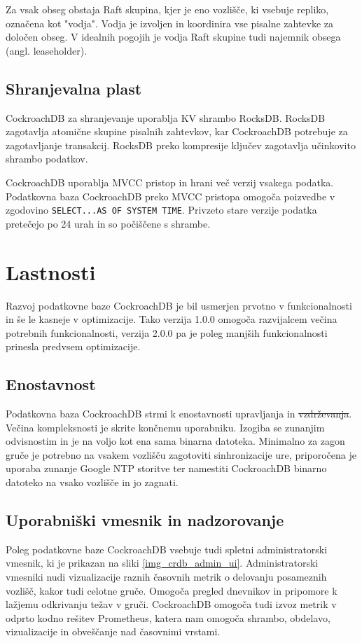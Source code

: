 \documentclass[a4paper, 12pt]{book}
\providecommand{\DIFaddtex}[1]{{\protect\color{blue}\uwave{#1}}} %
\providecommand{\DIFdeltex}[1]{{\protect\color{red}\sout{#1}}}                      %
\providecommand{\DIFaddbegin}{} %
\providecommand{\DIFaddend}{} %
\providecommand{\DIFdelbegin}{} %
\providecommand{\DIFdelend}{} %
\providecommand{\DIFadd}[1]{\texorpdfstring{\DIFaddtex{#1}}{#1}} %
\providecommand{\DIFdel}[1]{\texorpdfstring{\DIFdeltex{#1}}{}} %
\newcommand{\DIFscaledelfig}{0.5}
\newlength{\DIFdelgraphicswidth} %
\newlength{\DIFdelgraphicsheight} %
\newcommand{\DIFaddincludegraphics}[2][]{{\color{blue}\fbox{\DIFOincludegraphics[#1]{#2}}}} %
\newcommand{\DIFdelincludegraphics}[2][]{%
\sbox{\DIFdelgraphicsbox}{\DIFOincludegraphics[#1]{#2}}%
\settoboxwidth{\DIFdelgraphicswidth}{\DIFdelgraphicsbox} %
\settoboxtotalheight{\DIFdelgraphicsheight}{\DIFdelgraphicsbox} %
\scalebox{\DIFscaledelfig}{%
\parbox[b]{\DIFdelgraphicswidth}{\usebox{\DIFdelgraphicsbox}\\[-\baselineskip] \rule{\DIFdelgraphicswidth}{0em}}\llap{\resizebox{\DIFdelgraphicswidth}{\DIFdelgraphicsheight}{%
\setlength{\unitlength}{\DIFdelgraphicswidth}%
\begin{picture}(1,1)%
\thicklines\linethickness{2pt} %
{\color[rgb]{1,0,0}\put(0,0){\framebox(1,1){}}}%
{\color[rgb]{1,0,0}\put(0,0){\line( 1,1){1}}}%
{\color[rgb]{1,0,0}\put(0,1){\line(1,-1){1}}}%
\end{picture}%
}\hspace*{3pt}}} %
} %
\DeclareRobustCommand{\DIFaddbegin}{\DIFOaddbegin \let\includegraphics\DIFaddincludegraphics} %
\DeclareRobustCommand{\DIFaddend}{\DIFOaddend \let\includegraphics\DIFOincludegraphics} %
\DeclareRobustCommand{\DIFdelbegin}{\DIFOdelbegin \let\includegraphics\DIFdelincludegraphics} %
\DeclareRobustCommand{\DIFdelend}{\DIFOaddend \let\includegraphics\DIFOincludegraphics} %
\begin{document}
Za vsak obseg obstaja Raft skupina, kjer je eno vozlišče, ki vsebuje repliko, označena kot "vodja". Vodja je izvoljen in koordinira vse pisalne zahtevke za določen obseg. V idealnih pogojih je vodja Raft skupine tudi najemnik obsega (angl. leaseholder).


\subsection{Shranjevalna plast}

CockroachDB za shranjevanje uporablja KV shrambo RocksDB. RocksDB zagotavlja atomične skupine pisalnih zahtevkov, kar CockroachDB potrebuje za zagotavljanje transakcij. RocksDB preko kompresije ključev zagotavlja učinkovito shrambo podatkov.

CockroachDB uporablja MVCC pristop in hrani več verzij vsakega podatka. Podatkovna baza CockroachDB preko MVCC pristopa omogoča poizvedbe v zgodovino \texttt{SELECT...AS OF SYSTEM TIME}. Privzeto stare verzije podatka pretečejo po 24 urah in so počiščene s shrambe.

\section{Lastnosti}
Razvoj podatkovne baze CockroachDB je bil usmerjen prvotno v funkcionalnosti in še le kasneje v optimizacije. Tako verzija 1.0.0 omogoča razvijalcem večina potrebnih funkcionalnosti, verzija 2.0.0 pa je poleg manjših funkcionalnosti prinesla predvsem optimizacije.

\subsection{Enostavnost}
Podatkovna baza CockroachDB strmi k enostavnosti upravljanja in \DIFdelbegin \DIFdel{vzdrževanja}\DIFdelend \DIFaddbegin \DIFadd{vzdr\-že\-van\-ja}\DIFaddend . Večina kompleksnosti je skrite končnemu uporabniku. Izogiba se zunanjim odvisnostim in je na voljo kot ena sama binarna datoteka. Minimalno za zagon gruče je potrebno na vsakem vozlišču zagotoviti sinhronizacije ure, priporočena je uporaba zunanje Google NTP storitve ter namestiti CockroachDB binarno datoteko na vsako vozlišče in jo zagnati.

\subsection{Uporabniški vmesnik in nadzorovanje}
Poleg podatkovne baze CockroachDB vsebuje tudi spletni administratorski vmesnik, ki je prikazan na sliki \ref{img_crdb_admin_ui}. Administratorski vmesniki nudi vizualizacije raznih časovnih metrik o delovanju posameznih vozlišč, kakor tudi celotne gruče. Omogoča pregled dnevnikov in pripomore k lažjemu odkrivanju težav v gruči. CockroachDB omogoča tudi izvoz metrik v odprto kodno rešitev Prometheus, katera nam omogoča shrambo, obdelavo, vizualizacije in obveščanje nad časovnimi vrstami.
\end{document}

